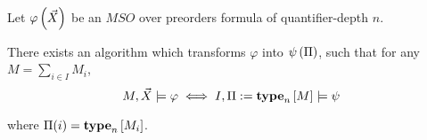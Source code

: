\begin{theorem}
  Let $\varphi \left( {\vec{X}} \right)$ be an $MSO$ over preorders formula of quantifier-depth $n$.

  There exists an algorithm which transforms $\varphi$ into $\psi \left( {\Pi} \right)$,
  such that for any $M = \sum_{i \in I} M_i$,
  \[
    M, \vec{X} \models \varphi \iff I, \Pi := \mathbf{type}_{n} \left[ {M} \right] \models \psi
  \]

  where $\Pi(i) = \mathbf{type}_{n} \left[ {M_i} \right]$.
\end{theorem}

\begin{corollary}

\end{corollary}